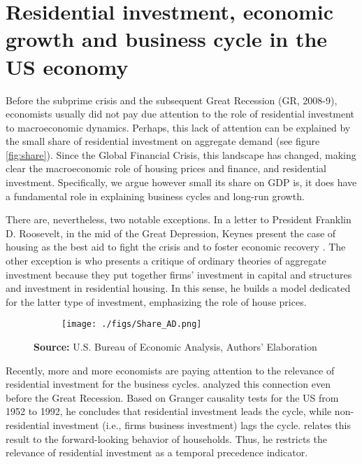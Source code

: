 \documentclass[12pt, a4paper]{article}
\begin{document}
\section{Residential investment, economic growth and business cycle in the US economy}
\label{sec:org45e0550}
\label{sec:Stylized_Facts}
Before the subprime crisis and the subsequent Great Recession (GR, 2008-9), economists usually did not pay due attention to the role of residential investment to macroeconomic dynamics.
Perhaps, this lack of attention can be explained by the small share of residential investment on aggregate demand (see figure \ref{fig:share}).
Since the Global Financial Crisis, this landscape has changed, making clear the macroeconomic role of housing prices and finance, and residential investment.
Specifically, we argue however small its share on GDP is, it does have a fundamental role in explaining business cycles and long-run growth.

There are, nevertheless, two notable exceptions. In a letter to President Franklin D. Roosevelt, in the mid of the Great Depression, Keynes present the case of housing as the best aid to fight the crisis and to foster economic recovery \cite[p.~436]{keynes_collected_1978}.
The other exception is \textcite{duesenberry_investment_1958} who presents a critique of ordinary theories of aggregate investment because they put together firms’ investment in capital and structures and investment in residential housing.
In this sense, he builds a model dedicated for the latter type of investment, emphasizing the role of house prices.


\begin{figure}[H]
    \centering
	\caption{Expenditures share on GDP}
	\label{fig:share}
\begin{figure}[htb]
    \texttt{[image: ./figs/Share\_AD.png]}
    \end{figure}
	\caption*{\textbf{Source:} U.S. Bureau of Economic Analysis, Authors' Elaboration}
\end{figure}

Recently, more and more economists are paying attention to the relevance of residential investment for the business cycles.
\textcite{green_follow_1997} analyzed this connection even before the Great Recession.
Based on Granger causality tests for the US from 1952 to 1992, he concludes that residential investment leads the cycle, while non-residential investment (i.e., firms business investment) lags the cycle.
\textcite{green_follow_1997} relates this result to the forward-looking behavior of households.
Thus, he restricts the relevance of residential investment as a temporal precedence indicator.
\end{document}
